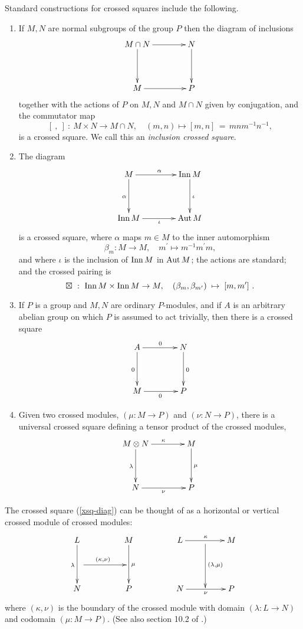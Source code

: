 \documentclass[a4paper,11pt]{article}
\theoremstyle{plain}
\theoremstyle{definition}
\begin{document}
Standard constructions for crossed squares include the following.
\begin{enumerate}
\item 
If $M,N$ are normal subgroups of the group $P$ then the diagram of inclusions
\[
\xymatrix@R=40pt@C=40pt
{ M \cap N \ar[r]^(0.6){} \ar[d]_{}  
	& N \ar[d]^{} \\
	M \ar[r]_{}  
	& P }
\] 
\noindent together with the actions of $P$ on $M,N$ and $M\cap N$ 
given by conjugation, and the commutator map 
\[
[~,~] ~:~ M\times N \rightarrow M\cap N,\quad 
(m,n)\mapsto [m,n] \,=\, mnm^{-1}n^{-1}, 
\] 
is a crossed square. 
We call this an \emph{inclusion crossed square}.
\item 
The diagram
\[
\xymatrix@R=40pt@C=40pt
{ M \ar[r]^{\alpha} \ar[d]_{\alpha} 
	& \Inn\,M \ar[d]^{\iota} \\
	\Inn\,M \ar[r]_{\iota} 
	& \Aut\,M }
\] 
\noindent is a crossed square, 
where $\alpha $ maps $m\in M$ to the inner automorphism%
\[
\beta_{m} : M \rightarrow M,\quad 
m^{\prime}\mapsto m^{-1}m^{\prime}m, 
\]
and where $\iota $ is the inclusion of $\mathrm{Inn}\,M$ in $\mathrm{Aut}\,M$; 
the actions are standard; and the crossed pairing is
\[
\boxtimes ~:~ \mathrm{Inn}\,M \times \mathrm{Inn}\,M \rightarrow M,\quad 
(\beta_{m},\beta_{m^{\prime}}) \;\mapsto\; [m,m^{\prime}]~.
\]
\item 
If $P$ is a group and $M,N$ are ordinary $P$-modules, 
and if $A$ is an arbitrary abelian group on which $P$ is assumed to act trivially, 
then there is a crossed square
\[
\xymatrix@R=40pt@C=40pt
{ A \ar[r]^{0} \ar[d]_{0}  
	& N \ar[d]^{0} \\
	M \ar[r]_{0} 
	& P }
\]
\item 
Given two crossed modules, $(\mu : M \rightarrow P)$ and $(\nu : N \rightarrow P)$, 
there is a universal crossed square defining a tensor product of the crossed modules, 
\[
\xymatrix@R=40pt@C=40pt
{ M \otimes N \ar[d]_{\lambda} \ar[r]^{\kappa} 
	& M \ar[d]^{\mu} \\ 
	N \ar[r]_{\nu} 
	& P } 
\]
\end{enumerate}

The crossed square (\ref{xsq-diag}) can be thought of as a horizontal or vertical 
crossed module of crossed modules:
\[
\xymatrix@R=20pt@C=20pt
{ L \ar[dd]_{\lambda}  
	&  &  M \ar[dd]^{\mu} 
	      &  &  L \ar[rr]^{\kappa}
	            &  {} \ar[dd]^{(\lambda,\mu)} 
	               &  M \\ 
\quad \ar[rr]^{(\kappa,\nu)} 
    &  &  &  &  &  & \quad \\
  N &  &  P 
	      &  &  N \ar[rr]_{\nu} 
	            &  {} 
	               &  P 
} 
\]
\noindent 
where $(\kappa,\nu)$ is the boundary of the crossed module with 
domain $(\lambda : L \rightarrow N)$ and codomain $(\mu : M \rightarrow P)$. 
(See also section 10.2 of \cite{wensley-notes}.)
\end{document}
